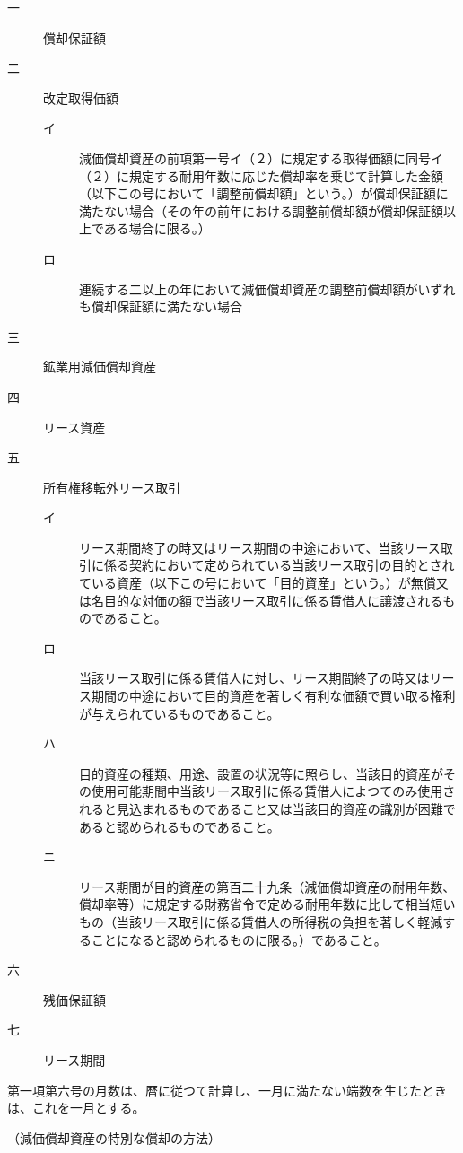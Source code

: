 \documentclass[twocolumn,a4j,10pt]{ltjtarticle}
\begin{document}
\begin{description}
\begin{description}
\item[一]償却保証額
\item[二]改定取得価額
\begin{description}
\item[イ]減価償却資産の前項第一号イ（２）に規定する取得価額に同号イ（２）に規定する耐用年数に応じた償却率を乗じて計算した金額（以下この号において「調整前償却額」という。）が償却保証額に満たない場合（その年の前年における調整前償却額が償却保証額以上である場合に限る。）
\item[ロ]連続する二以上の年において減価償却資産の調整前償却額がいずれも償却保証額に満たない場合
\end{description}
\item[三]鉱業用減価償却資産
\item[四]リース資産
\item[五]所有権移転外リース取引
\begin{description}
\item[イ]リース期間終了の時又はリース期間の中途において、当該リース取引に係る契約において定められている当該リース取引の目的とされている資産（以下この号において「目的資産」という。）が無償又は名目的な対価の額で当該リース取引に係る賃借人に譲渡されるものであること。
\item[ロ]当該リース取引に係る賃借人に対し、リース期間終了の時又はリース期間の中途において目的資産を著しく有利な価額で買い取る権利が与えられているものであること。
\item[ハ]目的資産の種類、用途、設置の状況等に照らし、当該目的資産がその使用可能期間中当該リース取引に係る賃借人によつてのみ使用されると見込まれるものであること又は当該目的資産の識別が困難であると認められるものであること。
\item[ニ]リース期間が目的資産の第百二十九条（減価償却資産の耐用年数、償却率等）に規定する財務省令で定める耐用年数に比して相当短いもの（当該リース取引に係る賃借人の所得税の負担を著しく軽減することになると認められるものに限る。）であること。
\end{description}
\item[六]残価保証額
\item[七]リース期間
\end{description}
\item[\rensuji{3}]第一項第六号の月数は、暦に従つて計算し、一月に満たない端数を生じたときは、これを一月とする。
\end{description}
\noindent\hspace{10pt}（減価償却資産の特別な償却の方法）
\end{document}
